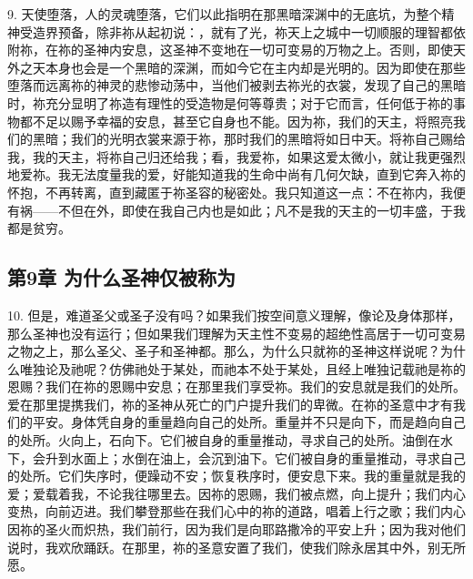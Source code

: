 9. 天使堕落，人的灵魂堕落，它们以此指明在那黑暗深渊中的无底坑，为整个精神受造界预备，除非祢从起初说：，就有了光，祢天上之城中一切顺服的理智都依附祢，在祢的圣神内安息，这圣神不变地在一切可变易的万物之上。否则，即使天外之天本身也会是一个黑暗的深渊，而如今它在主内却是光明的。因为即使在那些堕落而远离祢的神灵的悲惨动荡中，当他们被剥去祢光的衣裳，发现了自己的黑暗时，祢充分显明了祢造有理性的受造物是何等尊贵；对于它而言，任何低于祢的事物都不足以赐予幸福的安息，甚至它自身也不能。因为祢，我们的天主，将照亮我们的黑暗；我们的光明衣裳来源于祢，那时我们的黑暗将如日中天。将祢自己赐给我，我的天主，将祢自己归还给我；看，我爱祢，如果这爱太微小，就让我更强烈地爱祢。我无法度量我的爱，好能知道我的生命中尚有几何欠缺，直到它奔入祢的怀抱，不再转离，直到藏匿于祢圣容的秘密处。我只知道这一点：不在祢内，我便有祸——不但在外，即使在我自己内也是如此；凡不是我的天主的一切丰盛，于我都是贫穷。\par


\subsection{第9章 为什么圣神仅被称为}

10. 但是，难道圣父或圣子没有吗？如果我们按空间意义理解，像论及身体那样，那么圣神也没有运行；但如果我们理解为天主性不变易的超绝性高居于一切可变易之物之上，那么圣父、圣子和圣神都。那么，为什么只就祢的圣神这样说呢？为什么唯独论及祂呢？仿佛祂处于某处，而祂本不处于某处，且经上唯独记载祂是祢的恩赐？我们在祢的恩赐中安息；在那里我们享受祢。我们的安息就是我们的处所。爱在那里提携我们，祢的圣神从死亡的门户提升我们的卑微。在祢的圣意中才有我们的平安。身体凭自身的重量趋向自己的处所。重量并不只是向下，而是趋向自己的处所。火向上，石向下。它们被自身的重量推动，寻求自己的处所。油倒在水下，会升到水面上；水倒在油上，会沉到油下。它们被自身的重量推动，寻求自己的处所。它们失序时，便躁动不安；恢复秩序时，便安息下来。我的重量就是我的爱；爱载着我，不论我往哪里去。因祢的恩赐，我们被点燃，向上提升；我们内心变热，向前迈进。我们攀登那些在我们心中的祢的道路，唱着上行之歌；我们内心因祢的圣火而炽热，我们前行，因为我们是向耶路撒冷的平安上升；因为我对他们说时，我欢欣踊跃。在那里，祢的圣意安置了我们，使我们除永居其中外，别无所愿。\par


